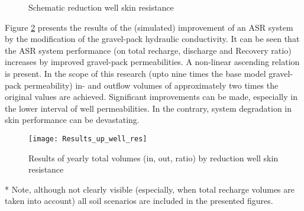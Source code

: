 \begin{figure}[H]
\centering
{}
\captionsetup{justification=centering}
\caption{Schematic reduction well skin resistance}
\label{fig:Schematic_up_well_res}
\end{figure}

Figure \ref{fig:Results_up_well_res} presents the results of the (simulated) improvement of an ASR system by the modification of the gravel-pack hydraulic conductivity. It can be seen that the ASR system performance (on total recharge, discharge and Recovery ratio) increases by improved gravel-pack permeabilities. A non-linear ascending relation is present. In the scope of this research (upto nine times the base model gravel-pack permeability) in- and outflow volumes of approximately two times the original values are achieved. Significant improvements can be made, especially in the lower interval of well permeabilities. In the contrary, system degradation in skin performance can be devastating. 

\begin{figure}[h!]
 \centering
 \texttt{[image: Results\_up\_well\_res]}
 \captionsetup{justification=centering} 
 \caption{Results of yearly total volumes (in, out, ratio) by reduction well skin resistance}
 \label{fig:Results_up_well_res}
\end{figure}

* Note, although not clearly visible (especially, when total recharge volumes are taken into account) all soil scenarios are included in the presented figures.  \\

